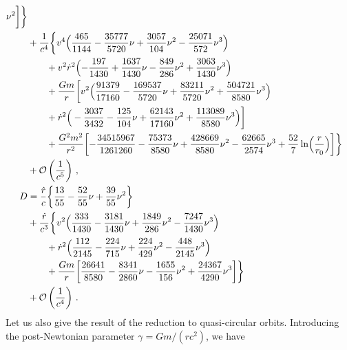 \documentclass[prd,preprint,superscriptaddress,tightenlines,nofootinbib,
  eqsecnum,showpacs]{revtex4}
\begin{document}
\begin{subequations}
\begin{align}
  \nu^2\biggr] \bigg\} \nonumber\\ & + \frac{1}{c^{4}} \biggl\{v^4
\Bigl(\frac{465}{1144} - \frac{35777}{5720} \nu + \frac{3057}{104}
\nu^2 - \frac{25071}{572} \nu^3\Bigr) \nonumber\\ & \qquad + v^2
\dot{r}^2 \Bigl(- \frac{197}{1430} + \frac{1637}{1430} \nu -
\frac{849}{286} \nu^2 + \frac{3063}{1430} \nu^3\Bigr)\nonumber\\ &
\qquad + \frac{G m}{r} \biggl[v^2 \Big(\frac{91379}{17160} -
  \frac{169537}{5720} \nu + \frac{83211}{5720} \nu^2+
  \frac{504721}{8580} \nu^3\Big)\nonumber\\ & \qquad + \dot{r}^2\Big(-
  \frac{3037}{3432} - \frac{125}{104} \nu + \frac{62143}{17160} \nu^2
  + \frac{113089}{8580} \nu^3\Big)\biggr] \nonumber\\ & \qquad +
\frac{G^2 m^2}{r^2} \biggl[- \frac{34515967}{1261260} -
  \frac{75373}{8580} \nu+ \frac{428669}{8580} \nu^2 -
  \frac{62665}{2574} \nu^3 +
  \frac{52}{7}\ln\Bigl(\frac{r}{r_0}\Bigr)\biggr]\biggr\}\nonumber\\ &
+ \mathcal{O}\left(\frac{1}{c^5}\right)\,,\\
D &=\frac{\dot{r}}{c} \biggl\{ \frac{13}{55} - \frac{52}{55} \nu +
\frac{39}{55} \nu^2\biggr\}\nonumber\\ & + \frac{\dot{r}}{c^{3}}
\biggl\{v^2 \Big(\frac{333}{1430} - \frac{3181}{1430} \nu +
\frac{1849}{286} \nu^2 - \frac{7247}{1430} \nu^3\Big) \nonumber\\ &
\qquad + \dot{r}^2 \Big(\frac{112}{2145}- \frac{224}{715} \nu +
\frac{224}{429} \nu^2 - \frac{448}{2145} \nu^3\Big)\nonumber\\ &
\qquad + \frac{G m}{r} \bigg[\frac{26641}{8580} - \frac{8341}{2860}
  \nu - \frac{1655}{156} \nu^2 + \frac{24367}{4290} \nu^3\bigg]
\biggr\} \nonumber\\ & + \mathcal{O}\left(\frac{1}{c^4}\right)\,.
\end{align}
\end{subequations}
%
Let us also give the result of the reduction to quasi-circular orbits.
Introducing the post-Newtonian parameter $\gamma=G m/(r c^2)$, we have
%
\end{document}
